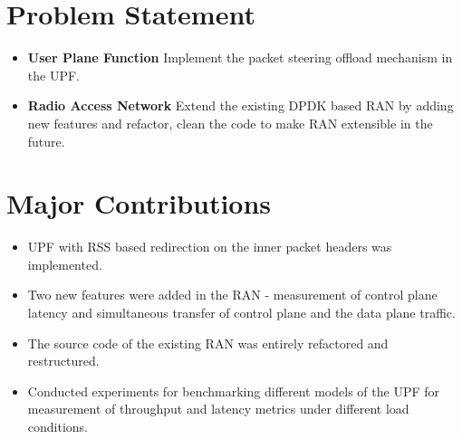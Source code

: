 \section{Problem Statement}
\begin{itemize}
	\item \textbf{User Plane Function} Implement the packet steering offload  mechanism in the UPF.  
	\item \textbf{Radio Access Network}  Extend the existing  DPDK based RAN by adding new features and refactor, clean the code to make RAN extensible in the future. 
\end{itemize}

\section{Major Contributions}
\begin{itemize}
	\item UPF with RSS based redirection on the inner packet headers was implemented. 
	\item Two new features were added in the RAN - measurement of control plane latency and simultaneous transfer of control plane and the data plane traffic.
	\item The source code of the existing RAN was entirely refactored and restructured.
	\item Conducted experiments for benchmarking different models of the UPF for measurement of throughput and latency metrics under different load conditions.
\end{itemize}